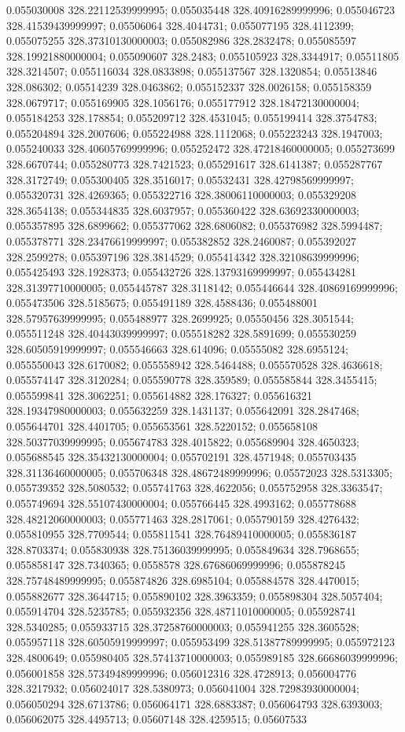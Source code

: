 0.055030008 328.22112539999995; 0.055035448 328.40916289999996; 0.055046723 328.41539439999997; 0.05506064 328.4044731; 0.055077195 328.4112399; 0.055075255 328.37310130000003; 0.055082986 328.2832478; 0.055085597 328.19921880000004; 0.055090607 328.2483; 0.055105923 328.3344917; 0.05511805 328.3214507; 0.055116034 328.0833898; 0.055137567 328.1320854; 0.05513846 328.086302; 0.05514239 328.0463862; 0.055152337 328.0026158; 0.055158359 328.0679717; 0.055169905 328.1056176; 0.055177912 328.18472130000004; 0.055184253 328.178854; 0.055209712 328.4531045; 0.055199414 328.3754783; 0.055204894 328.2007606; 0.055224988 328.1112068; 0.055223243 328.1947003; 0.055240033 328.40605769999996; 0.055252472 328.47218460000005; 0.055273699 328.6670744; 0.055280773 328.7421523; 0.055291617 328.6141387; 0.055287767 328.3172749; 0.055300405 328.3516017; 0.05532431 328.42798569999997; 0.055320731 328.4269365; 0.055322716 328.38006110000003; 0.055329208 328.3654138; 0.055344835 328.6037957; 0.055360422 328.63692330000003; 0.055357895 328.6899662; 0.055377062 328.6806082; 0.055376982 328.5994487; 0.055378771 328.23476619999997; 0.055382852 328.2460087; 0.055392027 328.2599278; 0.055397196 328.3814529; 0.055414342 328.32108639999996; 0.055425493 328.1928373; 0.055432726 328.13793169999997; 0.055434281 328.31397710000005; 0.055445787 328.3118142; 0.055446644 328.40869169999996; 0.055473506 328.5185675; 0.055491189 328.4588436; 0.055488001 328.57957639999995; 0.055488977 328.2699925; 0.05550456 328.3051544; 0.055511248 328.40443039999997; 0.055518282 328.5891699; 0.055530259 328.60505919999997; 0.055546663 328.614096; 0.05555082 328.6955124; 0.055550043 328.6170082; 0.055558942 328.5464488; 0.055570528 328.4636618; 0.055574147 328.3120284; 0.055590778 328.359589; 0.055585844 328.3455415; 0.055599841 328.3062251; 0.055614882 328.176327; 0.055616321 328.19347980000003; 0.055632259 328.1431137; 0.055642091 328.2847468; 0.055644701 328.4401705; 0.055653561 328.5220152; 0.055658108 328.50377039999995; 0.055674783 328.4015822; 0.055689904 328.4650323; 0.055688545 328.35432130000004; 0.055702191 328.4571948; 0.055703435 328.31136460000005; 0.055706348 328.48672489999996; 0.05572023 328.5313305; 0.055739352 328.5080532; 0.055741763 328.4622056; 0.055752958 328.3363547; 0.055749694 328.55107430000004; 0.055766445 328.4993162; 0.055778688 328.48212060000003; 0.055771463 328.2817061; 0.055790159 328.4276432; 0.055810955 328.7709544; 0.055811541 328.76489410000005; 0.055836187 328.8703374; 0.055830938 328.75136039999995; 0.055849634 328.7968655; 0.055858147 328.7340365; 0.0558578 328.67686069999996; 0.055878245 328.75748489999995; 0.055874826 328.6985104; 0.055884578 328.4470015; 0.055882677 328.3644715; 0.055890102 328.3963359; 0.055898304 328.5057404; 0.055914704 328.5235785; 0.055932356 328.48711010000005; 0.055928741 328.5340285; 0.055933715 328.37258760000003; 0.055941255 328.3605528; 0.055957118 328.60505919999997; 0.055953499 328.51387789999995; 0.055972123 328.4800649; 0.055980405 328.57413710000003; 0.055989185 328.66686039999996; 0.056001858 328.57349489999996; 0.056012316 328.4728913; 0.056004776 328.3217932; 0.056024017 328.5380973; 0.056041004 328.72983930000004; 0.056050294 328.6713786; 0.056064171 328.6883387; 0.056064793 328.6393003; 0.056062075 328.4495713; 0.05607148 328.4259515; 0.05607533 